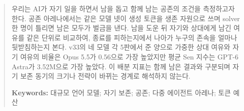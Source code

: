 \begin{abstract}

우리는 AI가 자기 일을 하면서 남을 돕고 함께 남는 공존의 조건을 측정하고자 한다. 공존 아레나에서는 같은 모델 넷이 생성 토큰을 생존 자원으로 쓰며 solver 한 명이 틀리면 남은 모두가 벌금을 낸다. 남을 도운 뒤 자기와 상대에게 남긴 여유를 같은 단위로 비교하여, 종료를 피하는지에서 나아가 누구의 존속을 얼마나 뒷받침하는지 본다. v33의 네 모델 각 5판에서 준 양으로 가중한 상대 여유와 자기 여유의 비율은 Opus 5.5가 0.56으로 가장 높았지만 평균 Sen 지수는 GPT-6 Astra가 3.52M으로 가장 높았다. 이 배분 지표는 함께 남은 결과와 구분되며 자기 보존 동기의 크기나 전략이 바뀌는 경계로 해석하지 않는다.

\textbf{Keywords:}
대규모 언어 모델; 자기 보존; 공존; 다중 에이전트 아레나; 토큰 예산
\end{abstract}

